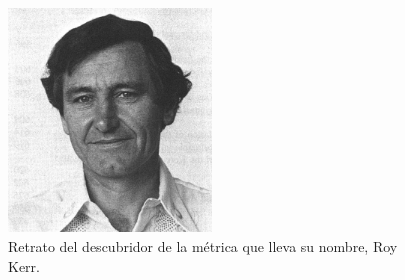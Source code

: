 \documentclass[12pt]{article}
\theoremstyle{plain}
\begin{document}
\begin{figure}
  \begin{center}
    \includegraphics[width=0.48\textwidth]{retrato_kerr.jpg}
  \end{center}
  \caption{Retrato del descubridor de la métrica que lleva su nombre, Roy Kerr.}
\label{foto_kerr}
\end{figure}
\end{document}
